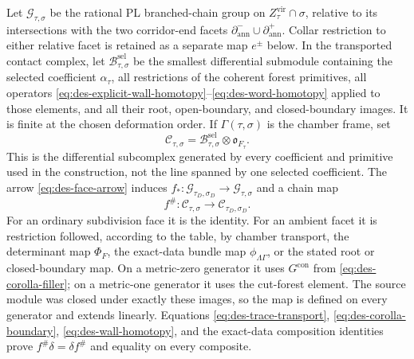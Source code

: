 Let $\mathcal G_{\tau,\sigma}$ be the rational PL branched-chain group on
$Z_\tau^{\mathrm{vir}}\cap\sigma$, relative to its intersections with the two
corridor-end facets $\partial_{\mathrm{ann}}^-\cup
\partial_{\mathrm{ann}}^+$.  Collar restriction to either relative facet is
retained as a separate map $e^\pm$ below.  In the transported contact complex,
let
$\mathcal B^{\mathrm{sel}}_{\tau,\sigma}$ be the smallest differential
submodule containing the selected coefficient $\alpha_\tau$, all restrictions of
the coherent forest primitives, all operators
\eqref{eq:des-explicit-wall-homotopy}--\eqref{eq:des-word-homotopy} applied to
those elements, and all their root, open-boundary, and closed-boundary images.
It is finite at the chosen deformation order.  If
$\Gamma(\tau,\sigma)$ is the chamber frame, set
\begin{equation}
 \mathcal C_{\tau,\sigma}
 =\mathcal B^{\mathrm{sel}}_{\tau,\sigma}
  \otimes\mathfrak o_{F_\tau}.
 \label{eq:des-cell-coefficient-complex}
\end{equation}
This is the differential subcomplex generated by every coefficient and
primitive used in the construction, not the line spanned by one selected
coefficient.
The arrow \eqref{eq:des-face-arrow} induces
$f_*:\mathcal G_{\tau_D,\sigma_D}\to\mathcal G_{\tau,\sigma}$ and a chain
map
\begin{equation}
 f^\#:\mathcal C_{\tau,\sigma}\longrightarrow
       \mathcal C_{\tau_D,\sigma_D}.
 \label{eq:des-coefficient-pullback}
\end{equation}
For an ordinary subdivision face it is the identity.  For an ambient facet it
is restriction followed, according to the table, by chamber transport, the
determinant map $\Phi_F$, the exact-data bundle map
$\phi_{\Lambda\Gamma}$, or the stated root or closed-boundary map.  On a
metric-zero generator it uses $G^{\mathrm{con}}$ from
\eqref{eq:des-corolla-filler}; on a metric-one generator it uses the cut-forest
element.  The source module was closed under exactly these images, so the map
is defined on every generator and extends linearly.  Equations
\eqref{eq:des-trace-transport}, \eqref{eq:des-corolla-boundary},
\eqref{eq:des-wall-homotopy}, and the exact-data composition identities prove
$f^\#\delta=\delta f^\#$ and equality on every composite.

